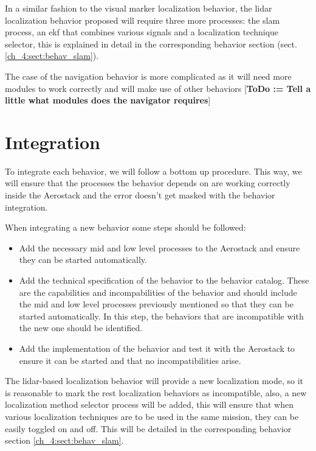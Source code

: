   In a similar fashion to the visual marker localization behavior, the lidar localization behavior proposed will require three more processes: the slam process, an ekf that combines various signals and a localization technique selector, this is explained in detail in the corresponding behavior section (sect. \ref{ch_4:sect:behav_slam}).

  The case of the navigation behavior is more complicated as it will need more modules to work correctly and will make use of other behaviors [\textbf{ToDo := Tell a little what modules does the navigator requires}]


\section{Integration} \label{ch_4:sect:integration}

  To integrate each behavior, we will follow a bottom up procedure. This way, we will ensure that the processes the behavior depends on are working correctly inside the Aerostack and the error doesn't get masked with the behavior integration.

  When integrating a new behavior some steps should be followed:
  \begin{itemize}
    \item Add the necessary mid and low level processes to the Aerostack and ensure they can be started automatically.
    \item Add the technical specification of the behavior to the behavior catalog. These are the capabilities and incompabilities of the behavior and should include the mid and low level processes previously mentioned so that they can be started automatically. In this step, the behaviors that are incompatible with the new one should be identified.
    \item Add the implementation of the behavior and test it with the Aerostack to ensure it can be started and that no incompatibilities arise.
  \end{itemize}

  The lidar-based localization behavior will provide a new localization mode, so it is reasonable to mark the rest localization behaviors as incompatible, also, a new localization method selector process will be added, this will ensure that when various localization techniques are to be used in the same mission, they can be easily toggled on and off. This will be detailed in the corresponding behavior section \ref{ch_4:sect:behav_slam}.

